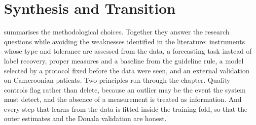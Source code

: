 \section{Synthesis and Transition}\label{sec:meth-synthesis}

 summarises the methodological choices. Together they answer the research questions while avoiding the weaknesses identified in the literature: instruments whose type and tolerance are assessed from the data, a forecasting task instead of label recovery, proper measures and a baseline from the guideline rule, a model selected by a protocol fixed before the data were seen, and an external validation on Cameroonian patients. Two principles run through the chapter. Quality controls flag rather than delete, because an outlier may be the event the system must detect, and the absence of a measurement is treated as information. And every step that learns from the data is fitted inside the training fold, so that the outer estimates and the Douala validation are honest.


